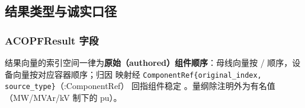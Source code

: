 \subsection{结果类型与诚实口径}\label{subsec:overview-result}

\subsubsection*{ACOPFResult 字段}


结果向量的索引空间一律为\textbf{原始（authored）组件顺序}：母线向量按
/ 顺序，设备向量按对应容器顺序；归因
映射经 \texttt{ComponentRef\{original\_index, source\_type\}}（:ComponentRef）
回指组件稳定 。量纲除注明外为有名值（MW/MVAr/kV 制下的 pu）。

